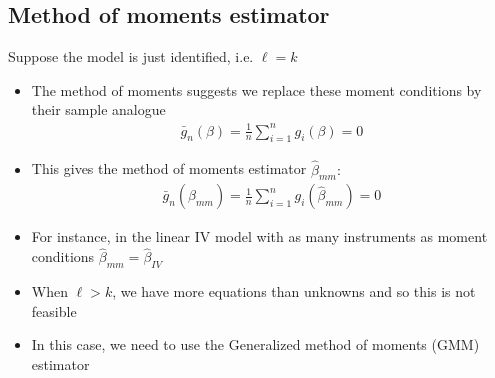 \documentclass[a4paper,twoside,11pt]{article}
\begin{document}
\subsection{Method of moments estimator}
Suppose the model is just identified, i.e. $\ell =k$ \begin{itemize}
    \item The method of moments suggests we replace these moment conditions by their sample analogue
\newline
\begin{equation*}
\begin{aligned}
\bar g_n (\beta) = \frac{1}{n} \sum^n_{i=1} g_i (\beta) =0 
\end{aligned} 
\end{equation*}
    \item This gives the method of moments estimator $\hat{\beta}_{mm}:$
\begin{equation*}
\begin{aligned}
\bar g_n (\hat{\beta}_{mm}) = \frac{1}{n} \sum^n_{i=1} g_i (\hat{\beta}_{mm}) = 0
\end{aligned} 
\end{equation*}
    \item For instance, in the linear IV model with as many instruments as moment conditions $\hat{\beta}_{mm} = \hat{\beta}_{IV}$
    \item When $\ell >k$, we have more equations than unknowns and so this is not feasible
    \item In this case, we need to use the Generalized method of moments (GMM) estimator
\end{itemize}
\end{document}
